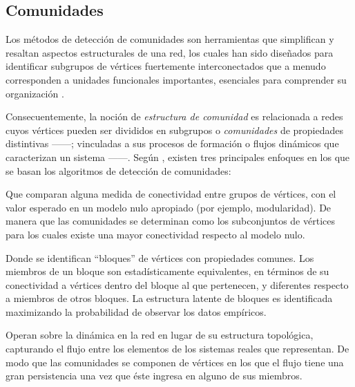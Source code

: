 \documentclass[letterpaper, 11pt]{book}
\theoremstyle{definition}
\theoremstyle{remark}
\begin{document}
\subsection{Comunidades}
\label{subsec:Comunidades}

Los métodos de detección de comunidades son herramientas que simplifican y resaltan aspectos estructurales de una red, los cuales han sido diseñados para identificar subgrupos de vértices fuertemente interconectados que a menudo corresponden a unidades funcionales importantes, esenciales para comprender su organización \citep[3]{2014_Rosvall_CommunityMapEq}. 

Consecuentemente, la noción de \emph{estructura de comunidad} es relacionada a redes cuyos vértices pueden ser divididos en subgrupos o \emph{comunidades} de propiedades distintivas ---\citet{2010_Newman_Networks}---; vinculadas a sus procesos de formación o flujos dinámicos que caracterizan un sistema ---\citet{2009_Rosvall_MapEquation}---. 
Según \citet{2014_Rosvall_CommunityMapEq}, existen tres principales enfoques en los que se basan los algoritmos de detección de comunidades: 
\begin{description}
    \setlength\itemsep{0em}
    \item[Modelos nulos.] Que comparan alguna medida de conectividad entre grupos de vértices, con el valor esperado en un modelo nulo apropiado (por ejemplo, modularidad). De manera que las comunidades se determinan como los subconjuntos de vértices para los cuales existe una mayor conectividad respecto al modelo nulo. 
    \item[Modelos de bloques.] Donde se identifican ``bloques'' de vértices con propiedades comunes. Los miembros de un bloque son estadísticamente equivalentes, en términos de su conectividad a vértices dentro del bloque al que pertenecen, y diferentes respecto a miembros de otros bloques. La estructura latente de bloques es identificada maximizando la probabilidad de observar los datos empíricos. 
    \item[Modelos de flujo.] Operan sobre la dinámica en la red en lugar de su estructura topológica, capturando el flujo entre los elementos de los sistemas reales que representan. De modo que las comunidades se componen de vértices en los que el flujo tiene una gran persistencia una vez que éste ingresa en alguno de sus miembros. 
\end{description}
\end{document}
